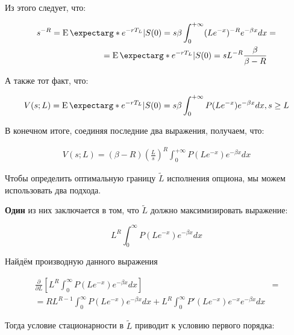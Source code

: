 \documentclass[a4paper,12pt]{article}
\theoremstyle{definition}
\newcommand{\expect}{\operatorname{E}\expectarg}
\begin{document}
Из этого следует, что:

\begin{equation*}
\begin{split}
    s^{-R} = \expect*{e^{-rT_L} | S(0) = s} \beta \int_{0}^{+\infty} (L e^{-x})^{-R} e^{-\beta x} dx &= \\
    = \expect*{e^{-rT_L} | S(0) = s} L^{-R} \frac{\beta}{\beta - R}
\end{split}
\end{equation*}

А также тот факт, что:

\begin{equation*}
\begin{split}
    V(s; L) = \expect*{e^{-rT_L} | S(0) = s} \beta \int_{0}^{+\infty} P(L e^{-x}) e^{-\beta x} dx, s \ge L
\end{split}
\end{equation*}

В конечном итоге, соединяя последние два выражения, получаем, что:

\begin{equation}\label{eq:strategy_price_m2}
\begin{split}
    V(s; L) = (\beta - R) (\frac{L}{s})^R \int_{0}^{+\infty} P(L e^{-x}) e^{-\beta x} dx
\end{split}
\end{equation}

Чтобы определить оптимальную границу $\tilde{L}$ исполнения опциона, мы можем использовать два подхода. 

\textbf{Один} из них заключается в том, что $\tilde{L}$ должно максимизировать выражение:

\begin{equation*}
L^R \int_{0}^{\infty} P(L e^{-x}) e^{-\beta x} dx
\end{equation*}

Найдём производную данного выражения

\begin{equation*}
\begin{split}
    \frac{\partial}{\partial L} \left[L^R \int_{0}^{\infty} P(L e^{-x}) e^{-\beta x} dx\right] &=\\
    = R L^{R-1}  \int_{0}^{\infty} P(L e^{-x}) e^{-\beta x} dx + L^R \int_{0}^{\infty} P'(L e^{-x}) e^{-x} e^{-\beta x} dx
\end{split}
\end{equation*}

Тогда условие стационарности в $\tilde{L}$ приводит к условию первого порядка:
\end{document}
